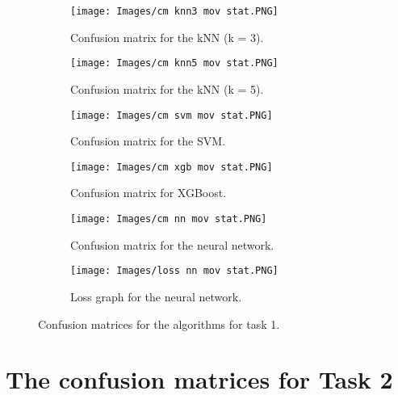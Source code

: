 \documentclass{article}
\begin{document}
%
\begin{figure}[ht]
\centering
\begin{subfigure}{.45\textwidth}
\centering
\texttt{[image: Images/cm knn3 mov stat.PNG]}
\caption{Confusion matrix for the kNN (k = 3).}
\end{subfigure}
\hfill
\begin{subfigure}{.45\textwidth}
\centering
\texttt{[image: Images/cm knn5 mov stat.PNG]}
\caption{Confusion matrix for the kNN (k = 5).}
\end{subfigure}
\medskip

\begin{subfigure}{.45\textwidth}
\centering
\texttt{[image: Images/cm svm mov stat.PNG]}
\caption{Confusion matrix for the SVM.}
\end{subfigure}
\hfill
\begin{subfigure}{.45\textwidth}
\centering
\texttt{[image: Images/cm xgb mov stat.PNG]}
\caption{Confusion matrix for XGBoost.}
\end{subfigure}
\medskip

\begin{subfigure}{.45\textwidth}
\centering
\texttt{[image: Images/cm nn mov stat.PNG]}
\caption{Confusion matrix for the neural network.}
\end{subfigure}
\hfill
\begin{subfigure}{.5\textwidth}
\centering
\texttt{[image: Images/loss nn mov stat.PNG]}
\caption{Loss graph for the neural network.}
\end{subfigure}

\caption{Confusion matrices for the algorithms for task 1.}
\label{fig:cm_mov_stat}
\end{figure}
%

\clearpage
\section{The confusion matrices for Task 2}
\label{appendix:CM2}
\end{document}

